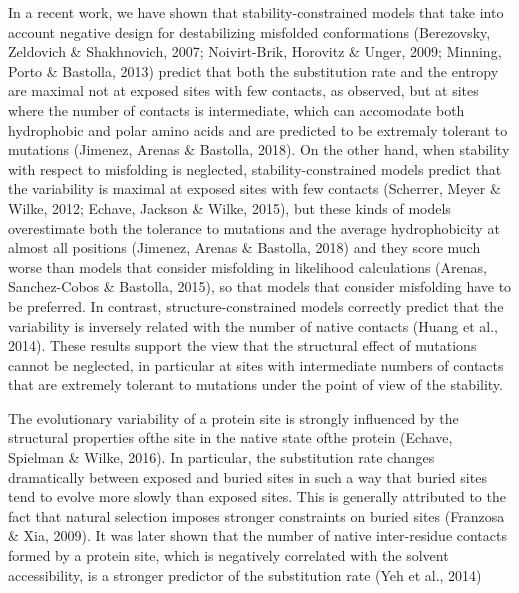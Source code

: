 In a recent work, we have shown that stability-constrained models that take into
account negative design for destabilizing misfolded conformations (Berezovsky, Zeldovich \& Shakhnovich, 2007; Noivirt-Brik, Horovitz \& Unger, 2009; Minning, Porto \& Bastolla, 2013) predict that both the \gls{substitution} rate and the entropy are maximal not at exposed sites with few contacts, as observed, but at sites where the number of contacts is intermediate, which can accomodate both hydrophobic and polar amino acids and are predicted to be extremaly tolerant to mutations (Jimenez, Arenas \& Bastolla, 2018). On the other hand, when stability with respect to misfolding is neglected, stability-constrained models predict that the variability is maximal at exposed sites with few contacts (Scherrer, Meyer \& Wilke, 2012; Echave, Jackson \& Wilke, 2015), but these kinds of models overestimate both the tolerance to mutations and the average hydrophobicity at almost all positions (Jimenez, Arenas \& Bastolla, 2018) and they score much worse than models that consider misfolding in \gls{likelihood} calculations (Arenas, Sanchez-Cobos \& Bastolla, 2015), so that models that consider misfolding have to be preferred. In contrast, structure-constrained models correctly predict that the variability is inversely related with the number of native contacts (Huang et al., 2014). These results support the view that the structural effect of mutations cannot be neglected, in particular at sites with intermediate numbers of contacts that are extremely tolerant to mutations under the point of view of the stability.

The evolutionary variability of a protein site is strongly influenced by the structural properties ofthe site in the native state ofthe protein (Echave, Spielman \& Wilke, 2016). In particular, the \gls{substitution} rate changes dramatically between exposed and buried sites in such a way that buried sites tend to evolve more slowly than exposed sites. This is generally attributed to the fact that natural selection imposes stronger constraints on buried sites (Franzosa \& Xia, 2009). It was later shown that the number of native inter-residue contacts formed by a protein site, which is negatively correlated with the solvent accessibility, is a stronger predictor of the \gls{substitution} rate (Yeh et al., 2014)

